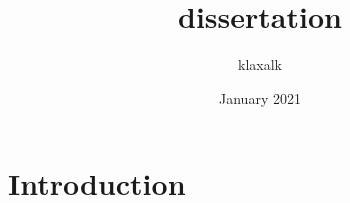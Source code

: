 \documentclass{article}
\title{dissertation}
\author{klaxalk }
\date{January 2021}
\begin{document}
\maketitle

\section{Introduction}
\end{document}
